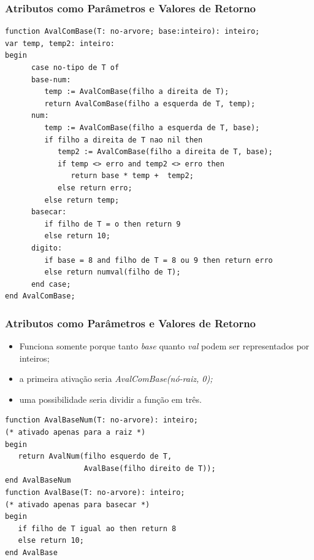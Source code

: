 \documentclass[table]{beamer}
\begin{document}
\begin{frame}[fragile]
   \frametitle{Atributos como Parâmetros e Valores de Retorno}
   \scriptsize
   \begin{verbatim}
function AvalComBase(T: no-arvore; base:inteiro): inteiro;
var temp, temp2: inteiro:
begin
      case no-tipo de T of
      base-num:
         temp := AvalComBase(filho a direita de T);
         return AvalComBase(filho a esquerda de T, temp);
      num:
         temp := AvalComBase(filho a esquerda de T, base);
         if filho a direita de T nao nil then
            temp2 := AvalComBase(filho a direita de T, base);
            if temp <> erro and temp2 <> erro then 
               return base * temp +  temp2;
            else return erro;
         else return temp;
      basecar:
         if filho de T = o then return 9
         else return 10;
      digito:
         if base = 8 and filho de T = 8 ou 9 then return erro
         else return numval(filho de T);
      end case;
end AvalComBase;
   \end{verbatim}
\end{frame}

\begin{frame}[fragile]
   \frametitle{Atributos como Parâmetros e Valores de Retorno}
   \begin{itemize}
      \item Funciona somente porque tanto \textit{base} quanto \textit{val} podem ser representados por inteiros;
      \item a primeira ativação seria \textit{AvalComBase(nó-raiz, 0);}
      \item uma possibilidade seria dividir a função em três.
   \end{itemize}
   \small
   \begin{verbatim}
function AvalBaseNum(T: no-arvore): inteiro;
(* ativado apenas para a raiz *)            
begin
   return AvalNum(filho esquerdo de T, 
                  AvalBase(filho direito de T));
end AvalBaseNum
function AvalBase(T: no-arvore): inteiro;
(* ativado apenas para basecar *)            
begin
   if filho de T igual ao then return 8
   else return 10;
end AvalBase
\end{verbatim}
\end{frame}
\end{document}
